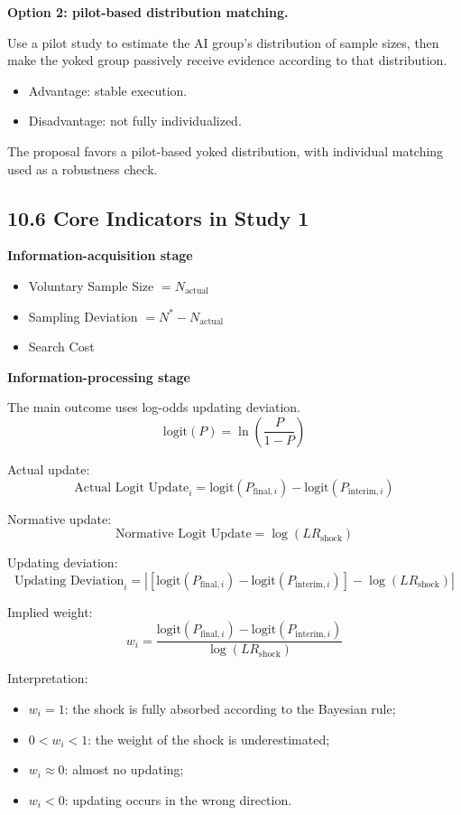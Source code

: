 \textbf{Option 2: pilot-based distribution matching.}

Use a pilot study to estimate the AI group's distribution of sample sizes, then make the yoked group passively receive evidence according to that distribution.
\begin{itemize}[leftmargin=1.5em]
\item Advantage: stable execution.
\item Disadvantage: not fully individualized.
\end{itemize}

The proposal favors a pilot-based yoked distribution, with individual matching used as a robustness check.

\subsection*{10.6 Core Indicators in Study 1}

\textbf{Information-acquisition stage}
\begin{itemize}[leftmargin=1.5em]
\item Voluntary Sample Size \(= N_{\text{actual}}\)
\item Sampling Deviation \(= N^{*} - N_{\text{actual}}\)
\item Search Cost
\end{itemize}

\textbf{Information-processing stage}

The main outcome uses log-odds updating deviation.
\[
\text{logit}(P) = \ln\!\left(\frac{P}{1-P}\right)
\]

Actual update:
\[
\text{Actual Logit Update}_{i}
= \text{logit}(P_{\text{final},i}) - \text{logit}(P_{\text{interim},i})
\]

Normative update:
\[
\text{Normative Logit Update} = \log(LR_{\text{shock}})
\]

Updating deviation:
\[
\text{Updating Deviation}_{i}
=
\left|
\left[
\text{logit}(P_{\text{final},i}) - \text{logit}(P_{\text{interim},i})
\right]
- \log(LR_{\text{shock}})
\right|
\]

Implied weight:
\[
w_{i}
=
\frac{
\text{logit}(P_{\text{final},i}) - \text{logit}(P_{\text{interim},i})
}{
\log(LR_{\text{shock}})
}
\]

Interpretation:
\begin{itemize}[leftmargin=1.5em]
\item \(w_{i} = 1\): the shock is fully absorbed according to the Bayesian rule;
\item \(0 < w_{i} < 1\): the weight of the shock is underestimated;
\item \(w_{i} \approx 0\): almost no updating;
\item \(w_{i} < 0\): updating occurs in the wrong direction.
\end{itemize}

